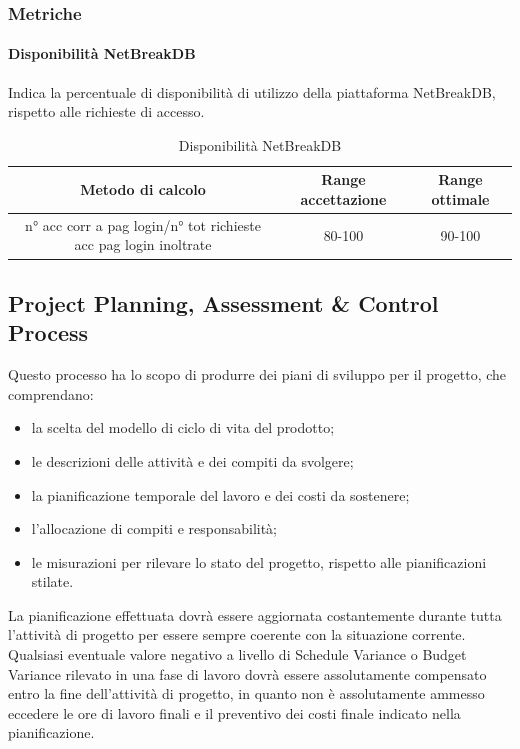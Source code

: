 		\subsubsection{Metriche}
			\paragraph{Disponibilità NetBreakDB}
			Indica la percentuale di disponibilità di utilizzo della piattaforma NetBreakDB, rispetto alle richieste di accesso.
			\begin{table}[H]
				\begin{center}
					\begin{tabular}{|c|c|c|}
						\hline
						\textbf{Metodo di calcolo} & \textbf{Range accettazione} & \textbf{Range ottimale} \\
						\hline
						n° acc corr	a pag login/n° tot richieste acc pag login inoltrate & 80-100  & 90-100 \\
						\hline
					\end{tabular}
				\end{center}
				\caption{Disponibilità NetBreakDB}
			\end{table}
	
	\subsection{Project Planning, Assessment \& Control Process}
	Questo processo ha lo scopo di produrre dei piani di sviluppo per il progetto, che comprendano:
	\begin{itemize}
		\item la scelta del modello di ciclo di vita del prodotto;
		\item le descrizioni delle attività e dei compiti da svolgere;
		\item la pianificazione temporale del lavoro e dei costi da sostenere;
		\item l'allocazione di compiti e responsabilità;
		\item le misurazioni per rilevare lo stato del progetto, rispetto alle pianificazioni stilate.
	\end{itemize}
	La pianificazione effettuata dovrà essere aggiornata costantemente durante tutta l’attività di
	progetto per essere sempre coerente con la situazione corrente. Qualsiasi eventuale valore negativo
	a livello di Schedule Variance o Budget Variance rilevato in una fase di lavoro dovrà essere
	assolutamente compensato entro la fine dell’attività di progetto, in quanto non è assolutamente
	ammesso eccedere le ore di lavoro finali e il preventivo dei costi finale indicato nella pianificazione.
